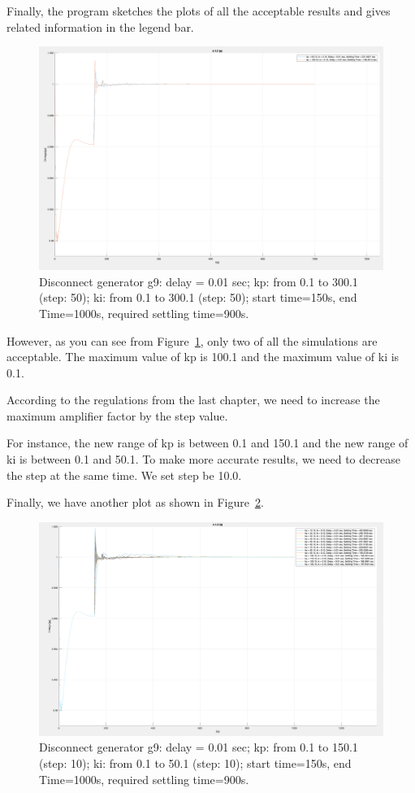 Finally, the program sketches the plots of all the acceptable results and gives related information in the legend bar.\\

\begin{figure}[htbp]
\centering
\includegraphics[width = .819\textwidth]{figure/4_1_2_a.png}
\caption{Disconnect generator g9: delay = 0.01 sec; kp: from 0.1 to 300.1 (step: 50); ki: from 0.1 to 300.1 (step: 50); start time=150s, end Time=1000s, required settling time=900s.}
\label{4_1_2_a}
\end{figure}

However, as you can see from Figure~\ref{4_1_2_a}, only two of all the simulations are acceptable. The maximum value of kp is 100.1 and the maximum value of ki is 0.1.  

According to the regulations from the last chapter, we need to increase the maximum amplifier factor by the step value.  

For instance, the new range of kp is between 0.1 and 150.1 and the new range of ki is between 0.1 and 50.1. To make more accurate results, we need to decrease the step at the same time. We set step be 10.0.  

Finally, we have another plot as shown in Figure~\ref{4_1_2_b}.  

\begin{figure}[htbp]
\centering
\includegraphics[width = .819\textwidth]{figure/4_1_2_b.png}
\caption{Disconnect generator g9: delay = 0.01 sec; kp: from 0.1 to 150.1 (step: 10); ki: from 0.1 to 50.1 (step: 10); start time=150s, end Time=1000s, required settling time=900s.}
\label{4_1_2_b}
\end{figure}


